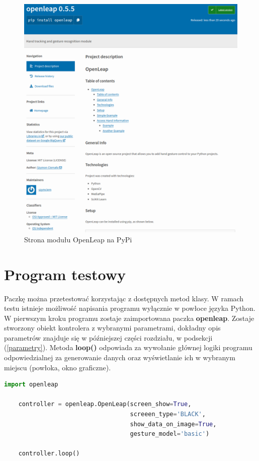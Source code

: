 \begin{figure}[H]
    \begin{center}
        \includegraphics[width=15cm]{../images/pypi_page.png}
        \caption{Strona modułu OpenLeap na PyPi}
    \end{center}
\end{figure}

\section{Program testowy}

\quad Paczkę można przetestować korzystając z dostępnych metod klasy. W ramach testu istnieje możliwość napisania programu wyłącznie w powłoce języka Python. W pierwszym kroku programu zostaje zaimportowana paczka \textbf{openleap}. Zostaje stworzony obiekt kontrolera z wybranymi parametrami, dokładny opis parametrów znajduje się w późniejszej części rozdziału, w podsekcji (\ref{parametry}). Metoda \textbf{loop()} odpowiada za wywołanie głównej logiki programu odpowiedzialnej za generowanie danych oraz wyświetlanie ich w wybranym miejscu (powłoka, okno graficzne).\newline

\begin{lstlisting}[language=python, style=programming, label={lst:simple_program}, caption={Program testowy}]
    import openleap

    controller = openleap.OpenLeap(screen_show=True, 
                                   screeen_type='BLACK', 
                                   show_data_on_image=True, 
                                   gesture_model='basic')
    
    controller.loop()
\end{lstlisting}

